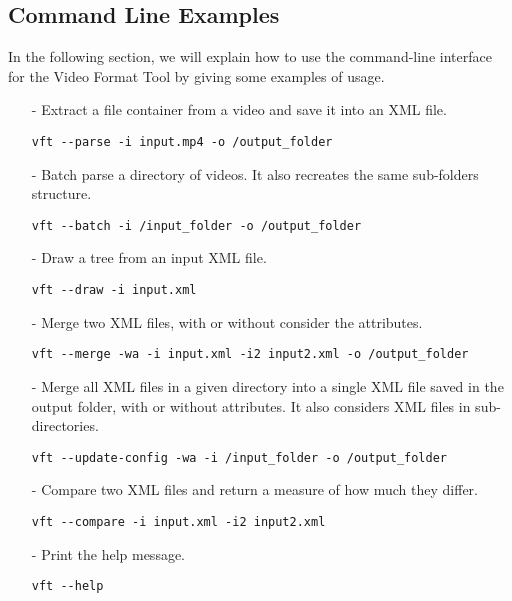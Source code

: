 \subsection{Command Line Examples}

In the following section, we will explain how to use the command-line interface for the Video Format Tool by giving some examples of usage.

\begin{itemize}

\item[-] Extract a file container from a video and save it into an XML file.
\begin{lstlisting}
vft --parse -i input.mp4 -o /output_folder
\end{lstlisting}

\item[-] Batch parse a directory of videos. It also recreates the same sub-folders structure.
\begin{lstlisting}
vft --batch -i /input_folder -o /output_folder
\end{lstlisting}

\item[-] Draw a tree from an input XML file.
\begin{lstlisting}
vft --draw -i input.xml
\end{lstlisting}

\item[-] Merge two XML files, with or without consider the attributes.
\begin{lstlisting}
vft --merge -wa -i input.xml -i2 input2.xml -o /output_folder
\end{lstlisting}

\item[-] Merge all XML files in a given directory into a single XML file saved in the output folder, with or without attributes. It also considers XML files in sub-directories.
\begin{lstlisting}
vft --update-config -wa -i /input_folder -o /output_folder
\end{lstlisting}

\item[-] Compare two XML files and return a measure of how much they differ.
\begin{lstlisting}
vft --compare -i input.xml -i2 input2.xml
\end{lstlisting}

\item[-] Print the help message.
\begin{lstlisting}
vft --help
\end{lstlisting}

\end{itemize}



